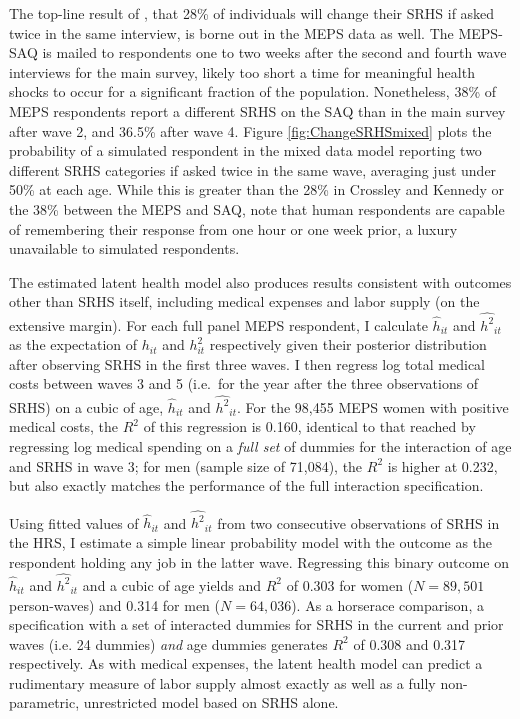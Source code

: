\documentclass[12pt,pdftex,letterpaper]{article}
\newcommand{\Health}{h}
\begin{document}
The top-line result of \cite{Crossley02}, that 28\% of individuals will change their SRHS if asked twice in the same interview, is borne out in the MEPS data as well.  The MEPS-SAQ is mailed to respondents one to two weeks after the second and fourth wave interviews for the main survey, likely too short a time for meaningful health shocks to occur for a significant fraction of the population.  Nonetheless, 38\% of MEPS respondents report a different SRHS on the SAQ than in the main survey after wave 2, and 36.5\% after wave 4.  Figure \ref{fig:ChangeSRHSmixed} plots the probability of a simulated respondent in the mixed data model reporting two different SRHS categories if asked twice in the same wave, averaging just under 50\% at each age.  While this is greater than the 28\% in Crossley and Kennedy or the 38\% between the MEPS and SAQ, note that human respondents are capable of remembering their response from one hour or one week prior, a luxury unavailable to simulated respondents.

The estimated latent health model also produces results consistent with outcomes other than SRHS itself, including medical expenses and labor supply (on the extensive margin).  For each full panel MEPS respondent, I calculate $\widehat{\Health}_{it}$ and $\widehat{\Health^2}_{it}$ as the expectation of $\Health_{it}$ and $\Health^2_{it}$ respectively given their posterior distribution after observing SRHS in the first three waves.  I then regress log total medical costs between waves 3 and 5 (i.e.\ for the year after the three observations of SRHS) on a cubic of age, $\widehat{\Health}_{it}$ and $\widehat{\Health^2}_{it}$.  For the 98,455 MEPS women with positive medical costs, the $R^2$ of this regression is 0.160, identical to that reached by regressing log medical spending on a \textit{full set} of dummies for the interaction of age and SRHS in wave 3; for men (sample size of 71,084), the $R^2$ is higher at 0.232, but also exactly matches the performance of the full interaction specification.

Using fitted values of $\widehat{\Health}_{it}$ and $\widehat{\Health^2}_{it}$ from two consecutive observations of SRHS in the HRS, I estimate a simple linear probability model with the outcome as the respondent holding any job in the latter wave.  Regressing this binary outcome on $\widehat{\Health}_{it}$ and $\widehat{\Health^2}_{it}$ and a cubic of age yields and $R^2$ of 0.303 for women ($N=89,501$ person-waves) and 0.314 for men ($N=64,036$).  As a horserace comparison, a specification with a set of interacted dummies for SRHS in the current and prior waves (i.e. 24 dummies) \textit{and} age dummies generates $R^2$ of 0.308 and 0.317 respectively.  As with medical expenses, the latent health model can predict a rudimentary measure of labor supply almost exactly as well as a fully non-parametric, unrestricted model based on SRHS alone. 
\end{document}

